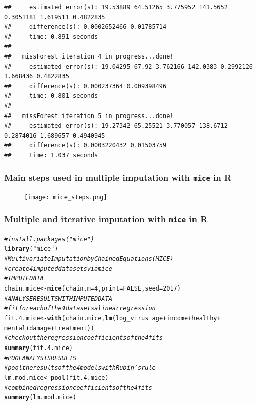 \documentclass{beamer}\usepackage[]{graphicx}\usepackage[]{color}
\makeatletter
\newcommand{\hlnum}[1]{\textcolor[rgb]{0.686,0.059,0.569}{#1}}%
\newcommand{\hlstr}[1]{\textcolor[rgb]{0.192,0.494,0.8}{#1}}%
\newcommand{\hlcom}[1]{\textcolor[rgb]{0.678,0.584,0.686}{\textit{#1}}}%
\newcommand{\hlopt}[1]{\textcolor[rgb]{0,0,0}{#1}}%
\newcommand{\hlstd}[1]{\textcolor[rgb]{0.345,0.345,0.345}{#1}}%
\newcommand{\hlkwb}[1]{\textcolor[rgb]{0.69,0.353,0.396}{#1}}%
\newcommand{\hlkwc}[1]{\textcolor[rgb]{0.333,0.667,0.333}{#1}}%
\newcommand{\hlkwd}[1]{\textcolor[rgb]{0.737,0.353,0.396}{\textbf{#1}}}%
\newenvironment{kframe}{%
 \def\at@end@of@kframe{}%
 \ifinner\ifhmode%
  \def\at@end@of@kframe{\end{minipage}}%
  \begin{minipage}{\columnwidth}%
 \fi\fi%
 \def\FrameCommand##1{\hskip\@totalleftmargin \hskip-\fboxsep
 \colorbox{shadecolor}{##1}\hskip-\fboxsep
     \hskip-\linewidth \hskip-\@totalleftmargin \hskip\columnwidth}%
 \MakeFramed {\advance\hsize-\width
   \@totalleftmargin\z@ \linewidth\hsize
   \@setminipage}}%
 {\par\unskip\endMakeFramed%
 \at@end@of@kframe}
\newenvironment{knitrout}{}{} %
\makeatother
\begin{document}
\begin{frame}[fragile]
\begin{knitrout}
\begin{kframe}
\begin{verbatim}
##     estimated error(s): 19.53889 64.51265 3.775952 141.5652 0.3051181 1.619511 0.4822835 
##     difference(s): 0.0002652466 0.01785714 
##     time: 0.891 seconds
## 
##   missForest iteration 4 in progress...done!
##     estimated error(s): 19.04295 67.92 3.762166 142.0383 0.2992126 1.668436 0.4822835 
##     difference(s): 0.000237364 0.009398496 
##     time: 0.801 seconds
## 
##   missForest iteration 5 in progress...done!
##     estimated error(s): 19.27342 65.25521 3.770057 138.6712 0.2874016 1.689657 0.4940945 
##     difference(s): 0.0003220432 0.01503759 
##     time: 1.037 seconds
\end{verbatim}
\end{kframe}
\end{knitrout}
\end{frame}

\begin{frame}
\frametitle{Main steps used in multiple imputation with \texttt{mice} in R}
\begin{figure}
\texttt{[image: mice\_steps.png]}
\end{figure}
\end{frame}

\begin{frame}[fragile]
\frametitle{Multiple and iterative imputation with \texttt{mice} in R}
\begin{knitrout}\tiny
{}\color{fgcolor}\begin{kframe}
\begin{alltt}
\hlcom{# install.packages("mice")}
\hlkwd{library}\hlstd{(}\hlstr{"mice"}\hlstd{)}
\hlcom{# Multivariate Imputation by Chained Equations (MICE)}
\hlcom{# create 4 imputed data sets via mice}
\hlcom{# IMPUTE DATA}
\hlstd{chain.mice} \hlkwb{<-} \hlkwd{mice}\hlstd{(chain,} \hlkwc{m} \hlstd{=} \hlnum{4}\hlstd{,} \hlkwc{print} \hlstd{=} \hlnum{FALSE}\hlstd{,} \hlkwc{seed} \hlstd{=} \hlnum{2017}\hlstd{)}
\hlcom{# ANALYSE RESULTS WITH IMPUTED DATA}
\hlcom{# fit for each of the 4 data sets a linear regression}
\hlstd{fit.4.mice} \hlkwb{<-} \hlkwd{with}\hlstd{(chain.mice,} \hlkwd{lm}\hlstd{(log_virus} \hlopt{~} \hlstd{age} \hlopt{+} \hlstd{income} \hlopt{+} \hlstd{healthy} \hlopt{+}
                                     \hlstd{mental} \hlopt{+} \hlstd{damage} \hlopt{+} \hlstd{treatment))}
\hlcom{# check out the regression coefficients of the 4 fits}
\hlkwd{summary}\hlstd{(fit.4.mice)}
\hlcom{# POOL ANALYSIS RESULTS}
\hlcom{# pool the results of the 4 models with Rubin's rule}
\hlstd{lm.mod.mice} \hlkwb{<-} \hlkwd{pool}\hlstd{(fit.4.mice)}
\hlcom{# combined regression coefficients of the 4 fits}
\hlkwd{summary}\hlstd{(lm.mod.mice)}
\end{alltt}
\end{kframe}
\end{knitrout}

\end{frame}
\end{document}
